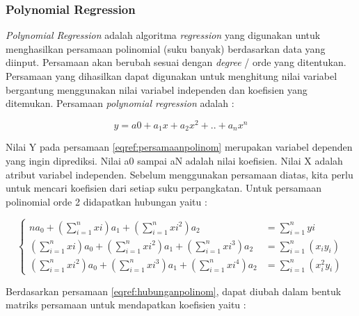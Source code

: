 		
\subsubsection{\textbf{Polynomial Regression}}
 \textit{Polynomial Regression} adalah algoritma \textit{regression} yang digunakan untuk menghasilkan persamaan polinomial (suku banyak) berdasarkan data yang diinput. Persamaan  akan berubah sesuai dengan \textit{degree} / orde yang ditentukan. Persamaan yang dihasilkan dapat digunakan untuk menghitung nilai variabel bergantung menggunakan nilai variabel independen dan koefisien yang ditemukan. Persamaan \textit{polynomial regression} adalah : 
		
		
		\begin{equation}
		   y = a0 + a_1x + a_2x^2 + .. +  a_n x^n     
		   \label{eqref:persamaanpolinom}
		\end{equation}
		
		
Nilai Y pada persamaan \ref{eqref:persamaanpolinom} merupakan variabel dependen yang ingin diprediksi. Nilai a0 sampai aN adalah nilai koefisien. Nilai X adalah atribut variabel independen. Sebelum menggunakan persamaan diatas, kita perlu untuk mencari koefisien dari setiap suku perpangkatan. Untuk persamaan polinomial orde 2 didapatkan hubungan yaitu : 
		
		
		\begin{equation}
		\begin{cases}
		  
		   	na_0 + (\sum_{i=1}^{n}xi) a_1 + (\sum_{i=1}^{n}xi ^2)a_2 &= \sum_{i = 1}^{n} yi \\
		   		(\sum_{i=1}^{n}xi) a_0 + (\sum_{i=1}^{n}xi^2)a_1 + (\sum_{i=1}^{n} xi^3)a_2 &= \sum_{i=1}^{n} (x_i y_i) \\
		   		(\sum_{i=1}^{n} xi^2)a_0 + (\sum_{i=1}^{n} xi^3)a_1 + (\sum_{i=1}^{n}xi^4)a_2 &= \sum_{i=1}^{n}(x_i^2 y_i)
		   
		\end{cases}
		\label{eqref:hubunganpolinom}
	   \end{equation}
		
Berdasarkan persamaan \ref{eqref:hubunganpolinom}, dapat diubah dalam bentuk matriks persamaan untuk mendapatkan koefisien yaitu : 
		
